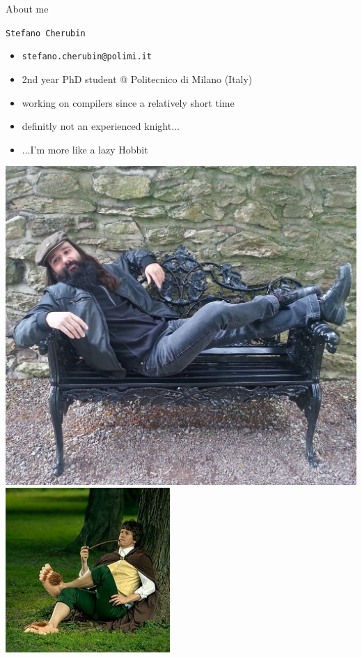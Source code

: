 \documentclass[10pt,mathserif]{beamer}
\begin{document}
\begin{frame}[t]{About me}
  \begin{huge}
    \texttt{Stefano Cherubin}
  \end{huge}
  \begin{itemize}
    \item \texttt{stefano.cherubin@polimi.it}
    \item 2nd year PhD student @ Politecnico di Milano (Italy)
    \item working on compilers since a relatively short time
    \item definitly not an experienced knight...
    \pause
    \item ...I'm more like a lazy Hobbit
  \end{itemize}
  \begin{center}
    \includegraphics[height=.35\textheight]{img/00/lazy_hobbit.jpg}
    \hspace{.1\textwidth}
    \includegraphics[height=.35\textheight]{img/00/lazy_hobbit_2.jpg}
  \end{center}
\end{frame}
\end{document}
